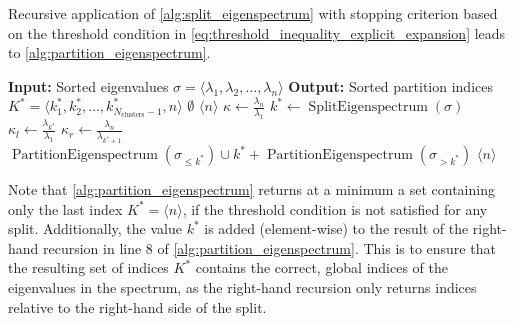 Recursive application of \cref{alg:split_eigenspectrum} with stopping criterion based on the threshold condition in \cref{eq:threshold_inequality_explicit_expansion} leads to \cref{alg:partition_eigenspectrum}.
\begin{algorithm}[H]
    \caption{$\operatorname{PartitionEigenspectrum}(\sigma)$}
    \begin{algorithmic}[1]
        \State \textbf{Input:} Sorted eigenvalues $\sigma = \langle\lambda_1, \lambda_2, \ldots, \lambda_n\rangle$
        \State \textbf{Output:} Sorted partition indices $K^* = \langle k^*_1, k^*_2, \ldots, k^*_{N_{\text{clusters}}-1}, n\rangle$
        \If{$\sigma = \emptyset$}
            \State \Return $\emptyset$
            \State \Return $\langle n \rangle$
        \EndIf
        \State $\kappa \gets \frac{\lambda_n}{\lambda_1}$
        \State $k^* \gets \operatorname{SplitEigenspectrum}(\sigma)$
        \State $\kappa_l \gets \frac{\lambda_{k^*}}{\lambda_1}$
        \State $\kappa_r \gets \frac{\lambda_n}{\lambda_{k^*+1}}$
        \State \Return $\operatorname{PartitionEigenspectrum}(\sigma_{\leq k^*}) \cup k^* + \operatorname{PartitionEigenspectrum}(\sigma_{>k^*})$
        \Else
        \State \Return $\langle n \rangle$ 
        \EndIf
    \end{algorithmic}
    \label{alg:partition_eigenspectrum}
\end{algorithm}
Note that \cref{alg:partition_eigenspectrum} returns at a minimum a set containing only the last index $K^*= \langle n \rangle$, if the threshold condition is not satisfied for any split. Additionally, the value $k^*$ is added (element-wise) to the result of the right-hand recursion in line 8 of \cref{alg:partition_eigenspectrum}. This is to ensure that the resulting set of indices $K^*$ contains the correct, global indices of the eigenvalues in the spectrum, as the right-hand recursion only returns indices relative to the right-hand side of the split.

